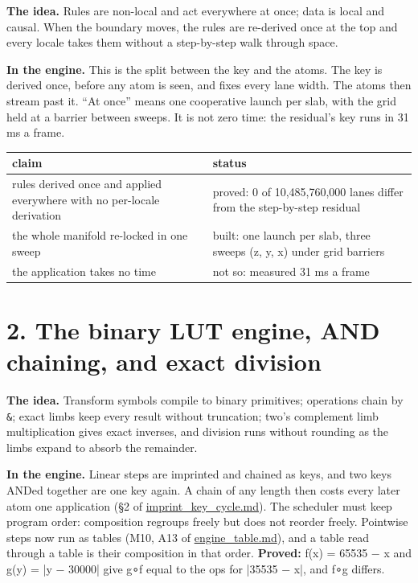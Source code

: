 \textbf{The idea.} Rules are non-local and act everywhere at once; data is local and causal. When the boundary moves, the rules are re-derived once at the top and every locale takes them without a step-by-step walk through space.

\textbf{In the engine.} This is the split between the key and the atoms. The key is derived once, before any atom is seen, and fixes every lane width. The atoms then stream past it. “At once” means one cooperative launch per slab, with the grid held at a barrier between sweeps. It is not zero time: the residual's key runs in 31 ms a frame.

{\small
\setlength{\tabcolsep}{6pt}
\begin{longtable}{>{\RaggedRight\arraybackslash}p{}>{\RaggedRight\arraybackslash}p{}}
\toprule
claim & status \\
\midrule
\endhead
rules derived once and applied everywhere with no per-locale derivation & proved: 0 of 10,485,760,000 lanes differ from the step-by-step residual \\
the whole manifold re-locked in one sweep & built: one launch per slab, three sweeps (z, y, x) under grid barriers \\
the application takes no time & not so: measured 31 ms a frame \\
\bottomrule
\end{longtable}
}

\section{\texorpdfstring{2. The binary LUT engine, AND chaining, and exact division}{2. The binary LUT engine, AND chaining, and exact division}}

\textbf{The idea.} Transform symbols compile to binary primitives; operations chain by \texttt{\&}; exact limbs keep every result without truncation; two's complement limb multiplication gives exact inverses, and division runs without rounding as the limbs expand to absorb the remainder.

\textbf{In the engine.} Linear steps are imprinted and chained as keys, and two keys ANDed together are one key again. A chain of any length then costs every later atom one application (§2 of \hyperref[chap:imprint-key-cycle]{imprint\_\allowbreak{}key\_\allowbreak{}cycle.md}). The scheduler must keep program order: composition regroups freely but does not reorder freely. Pointwise steps now run as tables (M10, A13 of \hyperref[chap:engine-table]{engine\_\allowbreak{}table.md}), and a table read through a table is their composition in that order. \textbf{Proved:} f(x) = 65535 − x and g(y) = |y − 30000| give g∘f equal to the ops for |35535 − x|, and f∘g differs.

